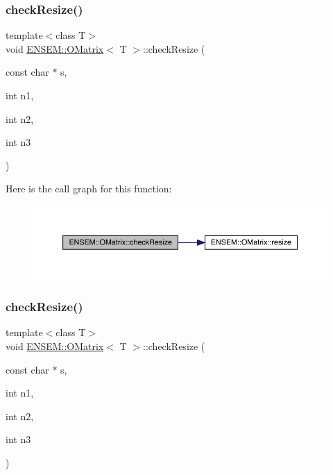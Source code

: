 \subsubsection{\texorpdfstring{checkResize()}{checkResize()}\hspace{0.1cm}{\footnotesize\ttfamily [7/9]}}
{\footnotesize\ttfamily template$<$class T$>$ \\
void \mbox{\hyperlink{classENSEM_1_1OMatrix}{E\+N\+S\+E\+M\+::\+O\+Matrix}}$<$ T $>$\+::check\+Resize (\begin{DoxyParamCaption}\item[{const char $\ast$}]{s,  }\item[{int}]{n1,  }\item[{int}]{n2,  }\item[{int}]{n3 }\end{DoxyParamCaption})\hspace{0.3cm}{\ttfamily [inline]}}

Here is the call graph for this function\+:
\nopagebreak
\begin{figure}[H]
\begin{center}
\leavevmode
\includegraphics[width=350pt]{dd/d80/classENSEM_1_1OMatrix_a532d2138ecffc7a153b831401ca8b4df_cgraph}
\end{center}
\end{figure}
\mbox{\label{classENSEM_1_1OMatrix_a532d2138ecffc7a153b831401ca8b4df}} 
\subsubsection{\texorpdfstring{checkResize()}{checkResize()}\hspace{0.1cm}{\footnotesize\ttfamily [8/9]}}
{\footnotesize\ttfamily template$<$class T$>$ \\
void \mbox{\hyperlink{classENSEM_1_1OMatrix}{E\+N\+S\+E\+M\+::\+O\+Matrix}}$<$ T $>$\+::check\+Resize (\begin{DoxyParamCaption}\item[{const char $\ast$}]{s,  }\item[{int}]{n1,  }\item[{int}]{n2,  }\item[{int}]{n3 }\end{DoxyParamCaption})\hspace{0.3cm}{\ttfamily [inline]}}

